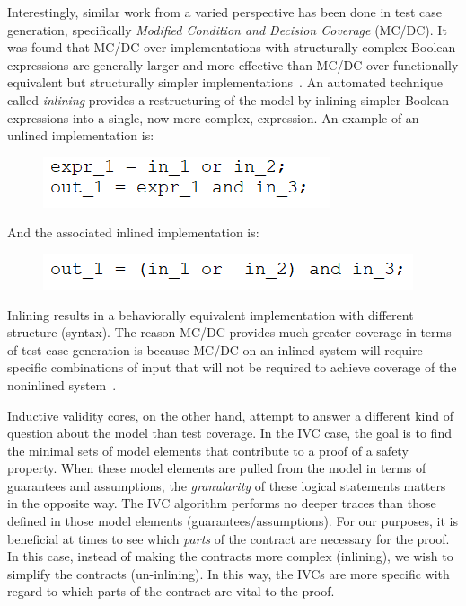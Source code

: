 Interestingly, similar work from a varied perspective has been done in test case generation, specifically \emph{Modified Condition and Decision Coverage} (MC/DC). It was found that MC/DC over implementations with structurally complex Boolean expressions are generally larger and more effective than MC/DC over functionally equivalent but structurally simpler implementations~\cite{gay2016effect}. An automated technique called \emph{inlining} provides a restructuring of the model by inlining simpler Boolean expressions into a single, now more complex, expression. An example of an unlined implementation is: 

\begin{figure}[h]
	\begin{center}
		\includegraphics[scale=1.0]{images/uninlinedEx.PNG}
	\end{center}
	\vspace{-1.5em}
\end{figure}

And the associated inlined implementation is: 

\begin{figure}[h]
	\begin{center}
		\includegraphics[scale=1.0]{images/inlined.PNG}
	\end{center}
	\vspace{-1.5em}
\end{figure}

Inlining results in a behaviorally equivalent implementation with different structure (syntax). The reason MC/DC provides much greater coverage in terms of test case generation is because MC/DC on an inlined system will require specific combinations of input that will not be required to achieve coverage of the noninlined system~\cite{gay2016effect}. 

Inductive validity cores, on the other hand, attempt to answer a different kind of question about the model than test coverage. In the IVC case, the goal is to find the minimal sets of model elements that contribute to a proof of a safety property. When these model elements are pulled from the model in terms of guarantees and assumptions, the \emph{granularity} of these logical statements matters in the opposite way. The IVC algorithm performs no deeper traces than those defined in those model elements (guarantees/assumptions). For our purposes, it is beneficial at times to see which \emph{parts} of the contract are necessary for the proof. In this case, instead of making the contracts more complex (inlining), we wish to simplify the contracts (un-inlining). In this way, the IVCs are more specific with regard to which parts of the contract are vital to the proof.

